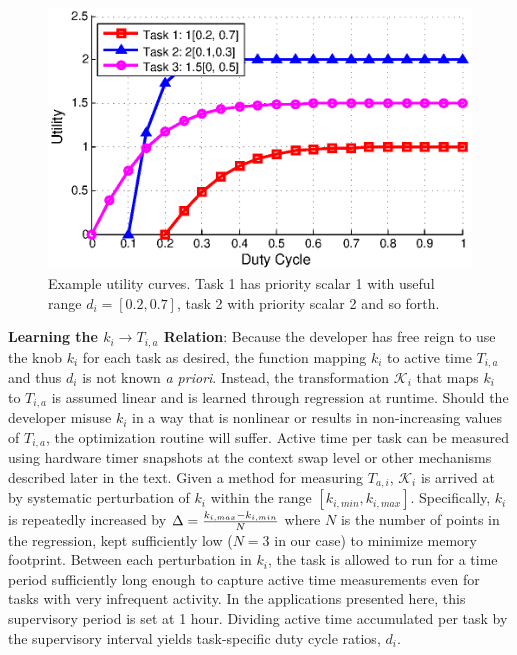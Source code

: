 \begin{figure}
\centering
\includegraphics[width=1\columnwidth]{figures/utilityfunctions.eps}
\caption{\label{fig:util}Example utility curves. Task 1 has priority scalar 1 with useful range $d_i = [0.2, 0.7]$, task 2 with priority scalar 2 and so forth. }
\end{figure}

\noindent\textbf{Learning the $k_i \rightarrow T_{i,a}$ Relation}: Because the developer has free reign to use the knob $k_i$ for each task as desired, the function mapping $k_i$ to active time $T_{i,a}$ and thus $d_i$ is not known \emph{a priori}. Instead, the transformation $\mathcal{K}_i$ that maps $k_i$ to $T_{i,a}$  is assumed linear and is learned through regression at runtime. Should the developer misuse $k_i$ in a way that is nonlinear or results in non-increasing values of $T_{i,a}$, the optimization routine will suffer. Active time per task can be measured using hardware timer snapshots at the context swap level or other mechanisms described later in the text.  Given a method for measuring $T_{a,i}$, $\mathcal{K}_i$ is arrived at by systematic perturbation of $k_i$ within the range $[k_{i,min}, k_{i,max}]$. Specifically, $k_i$ is repeatedly increased by $\Delta = {k_{i,max} - k_{i,min} \over N}$ where $N$ is the number of points in the regression, kept sufficiently low ($N = 3$ in our case) to minimize memory footprint.  Between each perturbation in $k_i$, the task is allowed to run for a time period sufficiently long enough to capture active time measurements even for tasks with very infrequent activity.  In the applications presented here, this supervisory period is set at 1 hour. Dividing active time accumulated per task by the supervisory interval yields task-specific duty cycle ratios, $d_i$. 


